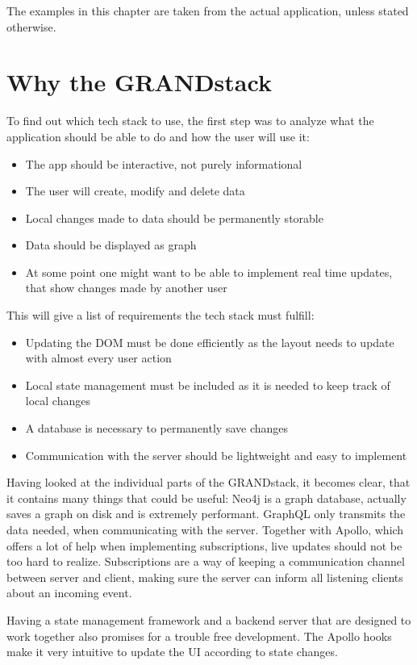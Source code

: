 The examples in this chapter are taken from the actual application, unless stated otherwise.

\section{Why the GRANDstack}
To find out which tech stack to use, the first step was to analyze what the application should be able to do and how the user will use it:
\begin{itemize}
\item The app should be interactive, not purely informational
\item The user will create, modify and delete data
\item Local changes made to data should be permanently storable
\item Data should be displayed as graph
\item At some point one might want to be able to implement real time updates, that show changes made by another user
\end{itemize}
This will give a list of requirements the tech stack must fulfill:
\begin{itemize}
\item Updating the DOM must be done efficiently as the layout needs to update with almost every user action
\item Local state management must be included as it is needed to keep track of local changes
\item A database is necessary to permanently save changes
\item Communication with the server should be lightweight and easy to implement
\end{itemize}

Having looked at the individual parts of the GRANDstack, it becomes clear, that it contains many things that could be useful: Neo4j is a graph database, actually saves a graph on disk and is extremely performant. GraphQL only transmits the data needed, when communicating with the server. Together with Apollo, which offers a lot of help when implementing subscriptions, live updates should not be too hard to realize. Subscriptions are a way of keeping a communication channel between server and client, making sure the server can inform all listening clients about an incoming event.

Having a state management framework and a backend server that are designed to work together also promises for a trouble free development. The Apollo hooks make it very intuitive to update the UI according to state changes.

